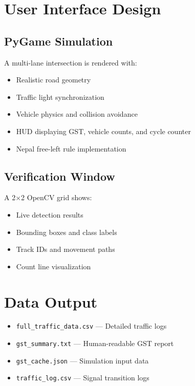 \section{User Interface Design}

\subsection{PyGame Simulation}
A multi-lane intersection is rendered with:
\begin{itemize}
    \item Realistic road geometry
    \item Traffic light synchronization
    \item Vehicle physics and collision avoidance
    \item HUD displaying GST, vehicle counts, and cycle counter
    \item Nepal free-left rule implementation
\end{itemize}

\subsection{Verification Window}
A 2$\times$2 OpenCV grid shows:
\begin{itemize}
    \item Live detection results
    \item Bounding boxes and class labels
    \item Track IDs and movement paths
    \item Count line visualization
\end{itemize}

\section{Data Output}

\begin{itemize}
    \item \texttt{full\_traffic\_data.csv} — Detailed traffic logs
    \item \texttt{gst\_summary.txt} — Human-readable GST report
    \item \texttt{gst\_cache.json} — Simulation input data
    \item \texttt{traffic\_log.csv} — Signal transition logs
\end{itemize}


